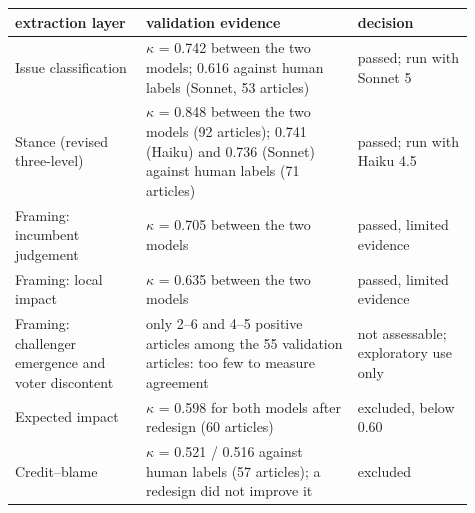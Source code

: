 \begin{tabular}{p{0.26\linewidth}p{0.42\linewidth}p{0.23\linewidth}}
\toprule
extraction layer & validation evidence & decision \\
\midrule
Issue classification & $\kappa$ = 0.742 between the two models; 0.616 against human labels (Sonnet, 53 articles) & passed; run with Sonnet 5 \\
Stance (revised three-level) & $\kappa$ = 0.848 between the two models (92 articles); 0.741 (Haiku) and 0.736 (Sonnet) against human labels (71 articles) & passed; run with Haiku 4.5 \\
Framing: incumbent judgement & $\kappa$ = 0.705 between the two models & passed, limited evidence \\
Framing: local impact & $\kappa$ = 0.635 between the two models & passed, limited evidence \\
Framing: challenger emergence and voter discontent & only 2--6 and 4--5 positive articles among the 55 validation articles: too few to measure agreement & not assessable; exploratory use only \\
Expected impact & $\kappa$ = 0.598 for both models after redesign (60 articles) & excluded, below 0.60 \\
Credit--blame & $\kappa$ = 0.521 / 0.516 against human labels (57 articles); a redesign did not improve it & excluded \\
\bottomrule
\end{tabular}
